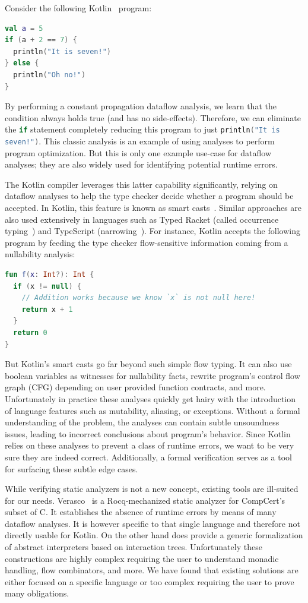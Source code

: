 \documentclass[runningheads]{llncs}
\newcommand{\kt}[1]{\lstinline[language=Kotlin]|#1|}
\begin{document}
Consider the following Kotlin~\cite{Kotlin} program:

\begin{lstlisting}[language=Kotlin]
val a = 5
if (a + 2 == 7) {
  println("It is seven!")
} else {
  println("Oh no!")
}
\end{lstlisting}

By performing a constant propagation dataflow analysis, we learn that the condition always holds true (and has no side-effects). Therefore, we can eliminate the \kt{if} statement completely reducing this program to just \kt{println("It is seven!")}. This classic analysis is an example of using analyses to perform program optimization. But this is only one example use-case for dataflow analyses; they are also widely used for identifying potential runtime errors.

The Kotlin compiler leverages this latter capability significantly, relying on dataflow analyses to help the type checker decide whether a program should be accepted. In Kotlin, this feature is known as smart casts~\cite{kotlin-smart-casts}. Similar approaches are also used extensively in languages such as Typed Racket (called occurrence typing~\cite{racket-occurrence-typing}) and TypeScript (narrowing~\cite{typescript-narrowing}). For instance, Kotlin accepts the following program by feeding the type checker flow-sensitive information coming from a nullability analysis:

\begin{lstlisting}[language=Kotlin]
fun f(x: Int?): Int {
  if (x != null) {
    // Addition works because we know `x` is not null here!
    return x + 1
  }
  return 0
}
\end{lstlisting}

But Kotlin's smart casts go far beyond such simple flow typing. It can also use boolean variables as witnesses for nullability facts, rewrite program's control flow graph (CFG) depending on user provided function contracts, and more. Unfortunately in practice these analyses quickly get hairy with the introduction of language features such as mutability, aliasing, or exceptions. Without a formal understanding of the problem, the analyses can contain subtle unsoundness issues, leading to incorrect conclusions about program's behavior. Since Kotlin relies on these analyses to prevent a class of runtime errors, we want to be very sure they are indeed correct. Additionally, a formal verification serves as a tool for surfacing these subtle edge cases.

While verifying static analyzers is not a new concept, existing tools are ill-suited for our needs. Verasco~\cite{Verasco} is a Rocq-mechanized static analyzer for CompCert's~\cite{CompCert} subset of C. It establishes the absence of runtime errors by means of many dataflow analyses. It is however specific to that single language and therefore not directly usable for Kotlin. On the other hand \cite{iTree} does provide a generic formalization of abstract interpreters based on interaction trees. Unfortunately these constructions are highly complex requiring the user to understand monadic handling, flow combinators, and more. We have found that existing solutions are either focused on a specific language or too complex requiring the user to prove many obligations.
\end{document}
